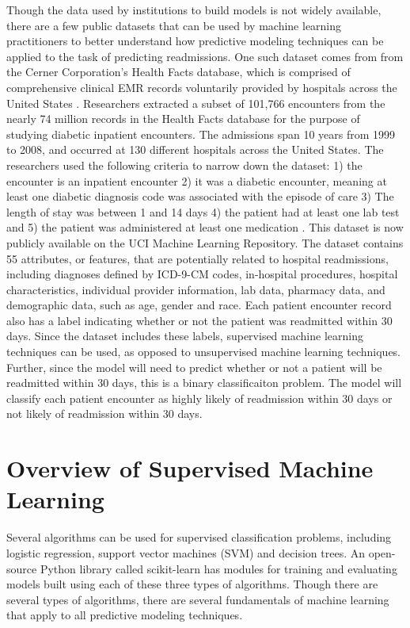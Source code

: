 \documentclass[sigconf]{acmart}
\begin{document}
Though the data used by institutions to build models is not widely available, there are a few public  datasets that can be used by machine learning practitioners to better understand how predictive modeling techniques can be applied to the task of predicting readmissions. One such dataset comes from from the Cerner Corporation's Health Facts database, which is comprised of comprehensive clinical EMR records voluntarily provided by hospitals across the United States \cite{cite11}.
Researchers extracted a subset of 101,766 encounters from the nearly 74 million records in the Health Facts database for the purpose of studying diabetic inpatient encounters. The admissions span 10 years from 1999 to 2008, and occurred at 130 different hospitals across the United States. The researchers used the following criteria to narrow down the dataset: 1) the encounter is an inpatient encounter 2) it was a diabetic encounter, meaning at least one diabetic diagnosis code was associated with the episode of care 3) The length of stay was between 1 and 14 days 4) the patient had at least one lab test and 5) the patient was administered at least one medication \cite{cite11}. This dataset is now publicly available on the UCI Machine Learning Repository.
The dataset contains 55 attributes, or features, that are potentially related to hospital readmissions, including diagnoses defined by ICD-9-CM codes, in-hospital procedures, hospital characteristics, individual provider information, lab data, pharmacy data, and demographic data, such as age, gender and race. Each patient encounter record also has a label indicating whether or not the patient was readmitted within 30 days. Since the dataset includes these labels, supervised machine learning techniques can be used, as opposed to unsupervised machine learning techniques. Further, since the model will need to predict whether or not a patient will be readmitted within 30 days, this is a binary classificaiton problem. The model will classify each patient encounter as highly likely of readmission within 30 days or not likely of readmission within 30 days.

\section{Overview of Supervised Machine Learning}

Several algorithms can be used for supervised classification problems, including logistic regression, support vector machines (SVM) and decision trees. An open-source Python library called scikit-learn has modules for training and evaluating models built using each of these three types of algorithms. Though there are several types of algorithms, there are several fundamentals of machine learning that apply to all predictive modeling techniques.
\end{document}
